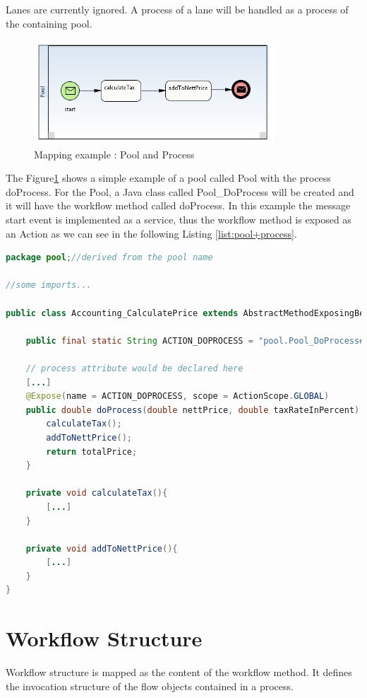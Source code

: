 Lanes are currently ignored. A process of a lane will be handled as a process of the containing pool.

\begin{figure}[h]
	\centering
		\includegraphics[width=0.80\textwidth]{images/mapping/pool_and_process.png}
	\caption{Mapping example : Pool and Process}
	\label{fig:pool+process}
\end{figure}

The Figure\ref{fig:pool+process} shows a simple example of a pool called Pool with the process doProcess. For the Pool, a Java class called Pool\_DoProcess will be created and it will have the workflow method called doProcess. In this example the message start event is implemented as a service, thus the workflow method is exposed as an Action as we can see in the following Listing \ref{list:pool+process}.  
\begin{lstlisting}[language = Java, caption =  Mapped element: Pool and Process (Figure \ref{fig:pool+process}), label = list:pool+process]
package pool;//derived from the pool name

//some imports...

public class Accounting_CalculatePrice extends AbstractMethodExposingBean{
	
	public final static String ACTION_DOPROCESS = "pool.Pool_DoProcess#doProcess"; 
	
	// process attribute would be declared here
	[...]
	@Expose(name = ACTION_DOPROCESS, scope = ActionScope.GLOBAL)
	public double doProcess(double nettPrice, double taxRateInPercent) {
		calculateTax();
		addToNettPrice();
		return totalPrice;
	}
	
	private void calculateTax(){
		[...]
	}
	
	private void addToNettPrice(){
		[...]
	}
}
\end{lstlisting}


\section{Workflow Structure}
Workflow structure is mapped as the content of the workflow method. It defines the invocation structure of the flow objects contained in a process.

